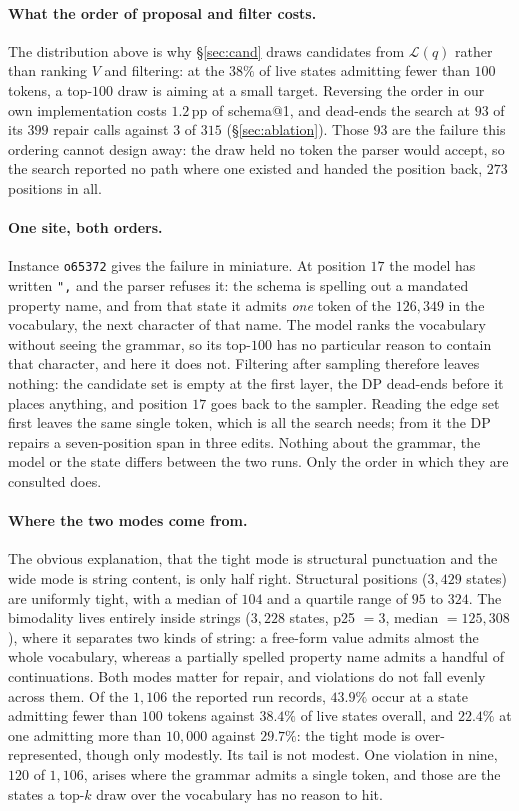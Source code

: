\paragraph{What the order of proposal and filter costs.}
The distribution above is why \S\ref{sec:cand} draws candidates from
$\mathcal{L}(q)$ rather than ranking $V$ and filtering: at the $38\%$ of live
states admitting fewer than $100$ tokens, a top-$100$ draw is aiming at a small
target. Reversing the order in our own
implementation costs $1.2$\,pp of schema@1, and dead-ends the search at $93$ of
its $399$ repair calls against $3$ of $315$ (\S\ref{sec:ablation}). Those $93$
are the failure this ordering cannot design away: the draw held no token the
parser would accept, so the search reported no path where one existed and handed
the position back, $273$ positions in all.

\paragraph{One site, both orders.}
Instance \texttt{o65372} gives the failure in miniature. At position $17$ the
model has written \texttt{",} and the parser refuses it: the schema is spelling
out a mandated property name, and from that state it admits \emph{one} token of
the $126{,}349$ in the vocabulary, the next character of that name. The model
ranks the vocabulary without seeing the grammar, so its top-$100$ has no
particular reason to contain that character, and here it does not. Filtering
after sampling therefore leaves nothing: the candidate set is empty at the first
layer, the DP dead-ends before it places anything, and position $17$ goes back to
the sampler. Reading the edge set first leaves the same single token, which is
all the search needs; from it the DP repairs a seven-position span in three
edits. Nothing about the grammar, the model or the state differs between the two
runs. Only the order in which they are consulted does.

\paragraph{Where the two modes come from.}
The obvious explanation, that the tight mode is structural punctuation and the
wide mode is string content, is only half right. Structural positions
($3{,}429$ states) are uniformly tight, with a median of $104$ and a quartile
range of $95$ to $324$. The bimodality lives entirely inside strings ($3{,}228$
states, p25 $=3$, median $=125{,}308$), where it separates two kinds of string:
a free-form value admits almost the whole vocabulary, whereas a partially
spelled property name admits a handful of continuations. Both modes matter for
repair, and violations do not fall evenly across them. Of the $1{,}106$ the
reported run records, $43.9\%$ occur at a state admitting fewer than $100$ tokens
against $38.4\%$ of live states overall, and $22.4\%$ at one admitting more than
$10{,}000$ against $29.7\%$: the tight mode is over-represented, though only
modestly. Its tail is not modest. One violation in nine, $120$ of $1{,}106$,
arises where the grammar admits a single token, and those are the states a
top-$k$ draw over the vocabulary has no reason to hit.

